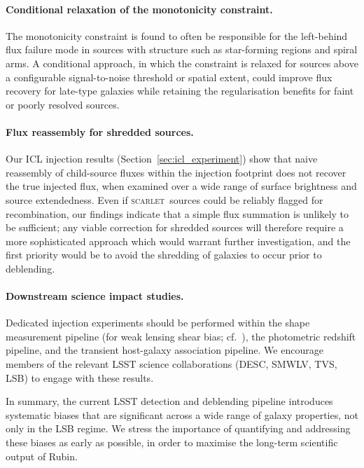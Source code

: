 \documentclass[DM,lsstdraft,authoryear,toc]{lsstdoc}
\newcommand{\scarlet}{\textsc{scarlet}\xspace}
\begin{document}
\paragraph{Conditional relaxation of the monotonicity constraint.}
The monotonicity constraint is found to often be responsible for the left-behind flux failure
mode in sources with structure such as star-forming regions and spiral arms. A conditional
approach, in which the constraint is relaxed for sources above a configurable
signal-to-noise threshold or spatial extent, could improve flux recovery for
late-type galaxies while retaining the regularisation benefits for faint or
poorly resolved sources.

\paragraph{Flux reassembly for shredded sources.}
Our ICL injection results (Section~\ref{sec:icl_experiment}) show that naive
reassembly of child-source fluxes within the injection footprint does not recover
the true injected flux, when examined over a wide range of surface brightness and
source extendedness. Even if \scarlet\ sources could be reliably flagged for
recombination, our findings indicate that a simple flux summation is unlikely to
be sufficient; any viable correction for shredded sources will therefore require a
more sophisticated approach which would warrant further investigation,
and the first priority would be to avoid the shredding of galaxies to occur prior to deblending.

\paragraph{Downstream science impact studies.}
Dedicated injection experiments should be performed within the shape
measurement pipeline (for weak lensing shear bias; cf.\ \citealt{LSST_DESC2018}),
the photometric redshift pipeline, and the transient host-galaxy association
pipeline. We encourage members of the relevant LSST science collaborations
(DESC, SMWLV, TVS, LSB) to engage with these results.

\smallskip
In summary, the current LSST detection and deblending pipeline introduces
systematic biases that are significant across a wide range of galaxy
properties, not only in the LSB regime. We stress the importance of
quantifying and addressing these biases as early as possible,
in order to maximise the long-term scientific output of Rubin.
\end{document}
